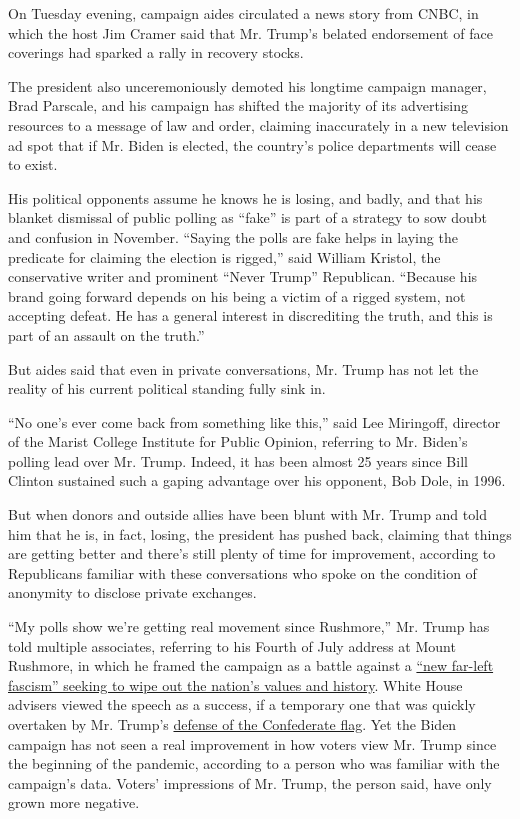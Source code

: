 On Tuesday evening, campaign aides circulated a news story from CNBC, in
which the host Jim Cramer said that Mr. Trump's belated endorsement of
face coverings had sparked a rally in recovery stocks.

The president also unceremoniously demoted his longtime campaign
manager, Brad Parscale, and his campaign has shifted the majority of its
advertising resources to a message of law and order, claiming
inaccurately in a new television ad spot that if Mr. Biden is elected,
the country's police departments will cease to exist.

His political opponents assume he knows he is losing, and badly, and
that his blanket dismissal of public polling as ``fake'' is part of a
strategy to sow doubt and confusion in November. ``Saying the polls are
fake helps in laying the predicate for claiming the election is
rigged,'' said William Kristol, the conservative writer and prominent
``Never Trump'' Republican. ``Because his brand going forward depends on
his being a victim of a rigged system, not accepting defeat. He has a
general interest in discrediting the truth, and this is part of an
assault on the truth.''

But aides said that even in private conversations, Mr. Trump has not let
the reality of his current political standing fully sink in.

``No one's ever come back from something like this,'' said Lee
Miringoff, director of the Marist College Institute for Public Opinion,
referring to Mr. Biden's polling lead over Mr. Trump. Indeed, it has
been almost 25 years since Bill Clinton sustained such a gaping
advantage over his opponent, Bob Dole, in 1996.

But when donors and outside allies have been blunt with Mr. Trump and
told him that he is, in fact, losing, the president has pushed back,
claiming that things are getting better and there's still plenty of time
for improvement, according to Republicans familiar with these
conversations who spoke on the condition of anonymity to disclose
private exchanges.

``My polls show we're getting real movement since Rushmore,'' Mr. Trump
has told multiple associates, referring to his Fourth of July address at
Mount Rushmore, in which he framed the campaign as a battle against a
\href{https://www.nytimes.com/2020/07/03/us/politics/trump-coronavirus-mount-rushmore.html}{``new
far-left fascism'' seeking to wipe out the nation's values and history}.
White House advisers viewed the speech as a success, if a temporary one
that was quickly overtaken by Mr. Trump's
\href{https://www.nytimes.com/2020/07/06/us/politics/trump-bubba-wallace-nascar.html}{defense
of the Confederate flag}. Yet the Biden campaign has not seen a real
improvement in how voters view Mr. Trump since the beginning of the
pandemic, according to a person who was familiar with the campaign's
data. Voters' impressions of Mr. Trump, the person said, have only grown
more negative.

